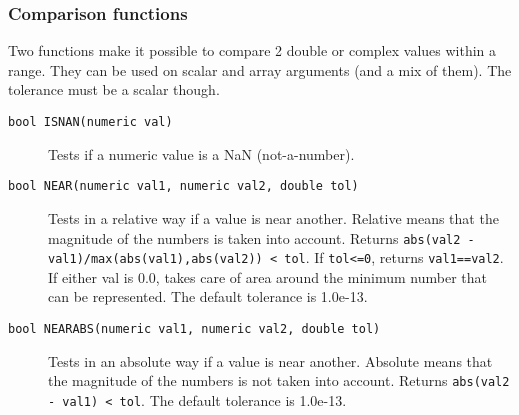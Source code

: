 \subsubsection{Comparison functions}
Two functions make it possible to compare 2 double or complex
values within a range.
They can be used on scalar and array arguments (and a mix of them).
The tolerance must be a scalar though.
\begin{description}
  \item[ \texttt{bool ISNAN(numeric val)}]
    Tests if a numeric value is a NaN (not-a-number).
  \item[ \texttt{bool NEAR(numeric val1, numeric val2, double tol)}]
    Tests in a relative way if a value is near another. Relative
    means that the
    magnitude of the numbers is taken into account.
    Returns \texttt{abs(val2 - val1)/max(abs(val1),abs(val2)) < tol}.
    If \texttt{tol<=0}, returns \texttt{val1==val2}.
    If either val is 0.0, takes
    care of area around the minimum number that can be represented.
    The default tolerance is 1.0e-13.
  \item[ \texttt{bool NEARABS(numeric val1, numeric val2, double tol)}]
    Tests in an absolute way if a value is near another. Absolute
    means that the
    magnitude of the numbers is not taken into account.
    Returns \texttt{abs(val2 - val1) < tol}.
    The default tolerance is 1.0e-13.
\end{description}

